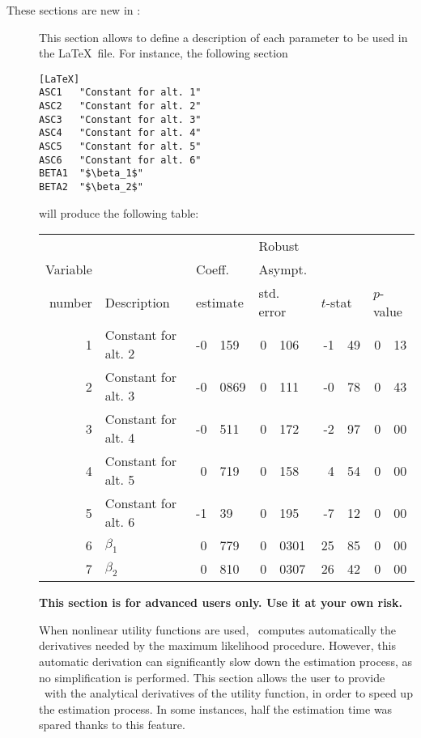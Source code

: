 \documentclass[12pt]{memoir}
\begin{document}
These sections are new in \BIOGEME :
\begin{description}
\item[]
This section allows to define a description of each parameter to be used in the \LaTeX\ file. For instance, the following section
{\footnotesize
\begin{verbatim}
[LaTeX]
ASC1   "Constant for alt. 1"
ASC2   "Constant for alt. 2"
ASC3   "Constant for alt. 3"
ASC4   "Constant for alt. 4"
ASC5   "Constant for alt. 5"
ASC6   "Constant for alt. 6"
BETA1  "$\beta_1$"
BETA2  "$\beta_2$"
\end{verbatim}
}
will produce the following table:
\begin{center}
{\small
\begin{tabular}{rlr@{.}lr@{.}lr@{.}lr@{.}l}
         &                       &   \multicolumn{2}{l}{}    & \multicolumn{2}{l}{Robust}  &     \multicolumn{4}{l}{}   \\
Variable &                       &   \multicolumn{2}{l}{Coeff.}      & \multicolumn{2}{l}{Asympt.}  &     \multicolumn{4}{l}{}   \\
number &  Description                     &   \multicolumn{2}{l}{estimate}      & \multicolumn{2}{l}{std. error}  &   \multicolumn{2}{l}{$t$-stat}  &   \multicolumn{2}{l}{$p$-value}   \\

\hline

1 & Constant for alt. 2 & -0&159 & 0&106 & -1&49 & 0&13 \\
2 & Constant for alt. 3 & -0&0869 & 0&111 & -0&78 & 0&43 \\
3 & Constant for alt. 4 & -0&511 & 0&172 & -2&97 & 0&00 \\
4 & Constant for alt. 5 & 0&719 & 0&158 & 4&54 & 0&00 \\
5 & Constant for alt. 6 & -1&39 & 0&195 & -7&12 & 0&00 \\
6 & $\beta_1$ & 0&779 & 0&0301 & 25&85 & 0&00 \\
7 & $\beta_2$ & 0&810 & 0&0307 & 26&42 & 0&00 \\
\hline

\end{tabular}
}
\end{center}

\item[]

\textbf{This section is for advanced users only. Use it at your own risk.}

When nonlinear utility functions are used, \BIOGEME\ computes
automatically the derivatives needed by the maximum likelihood
procedure. However, this automatic derivation can significantly slow
down the estimation process, as no simplification is performed. This
section allows the user to provide \BIOGEME\ with the analytical
derivatives of the utility function, in order to speed up the estimation process. In some instances, half the estimation time was spared thanks to this feature.  


\end{description}
\end{document}
